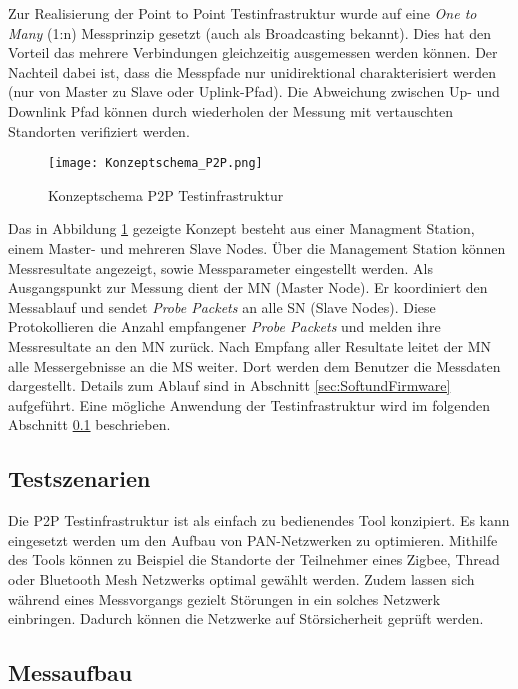 Zur Realisierung der Point to Point Testinfrastruktur wurde auf eine \textit{One to Many} (1:n) Messprinzip gesetzt (auch als Broadcasting bekannt). Dies hat den Vorteil das mehrere Verbindungen gleichzeitig ausgemessen werden können. Der Nachteil dabei ist, dass die Messpfade nur unidirektional charakterisiert werden (nur von Master zu Slave oder Uplink-Pfad). Die Abweichung zwischen Up- und Downlink Pfad können durch wiederholen der Messung mit vertauschten Standorten verifiziert werden. 

\begin{figure} [H]
	\centering
	\texttt{[image: Konzeptschema\_P2P.png]}
	\caption{Konzeptschema P2P Testinfrastruktur}
	\label{fig:KonzeptschemaP2P}
\end{figure}

Das in Abbildung \ref{fig:KonzeptschemaP2P} gezeigte Konzept besteht aus einer Managment Station, einem Master- und mehreren Slave Nodes. Über die Management Station können Messresultate angezeigt, sowie Messparameter eingestellt werden. Als Ausgangspunkt zur Messung dient der MN (Master Node). Er koordiniert den Messablauf und sendet \textit{Probe Packets} an alle SN (Slave Nodes). Diese Protokollieren die Anzahl empfangener \textit{Probe Packets} und melden ihre Messresultate an den MN zurück. Nach Empfang aller Resultate leitet der MN alle Messergebnisse an die MS weiter. Dort werden dem Benutzer die Messdaten dargestellt. Details zum Ablauf sind in Abschnitt \ref{sec:SoftundFirmware} aufgeführt. Eine mögliche Anwendung der Testinfrastruktur wird im folgenden Abschnitt \ref{sec:TestszenarienP2P} beschrieben.  

\subsection{Testszenarien}\label{sec:TestszenarienP2P}

Die P2P Testinfrastruktur ist als einfach zu bedienendes Tool konzipiert. Es kann eingesetzt werden um den Aufbau von PAN-Netzwerken zu optimieren. Mithilfe des Tools können zu Beispiel die Standorte der Teilnehmer eines Zigbee, Thread oder Bluetooth Mesh Netzwerks optimal gewählt werden. Zudem lassen sich während eines Messvorgangs gezielt Störungen in ein solches Netzwerk einbringen. Dadurch können die Netzwerke auf Störsicherheit geprüft werden. 



\subsection{Messaufbau}\label{sec:Messaufbau}

